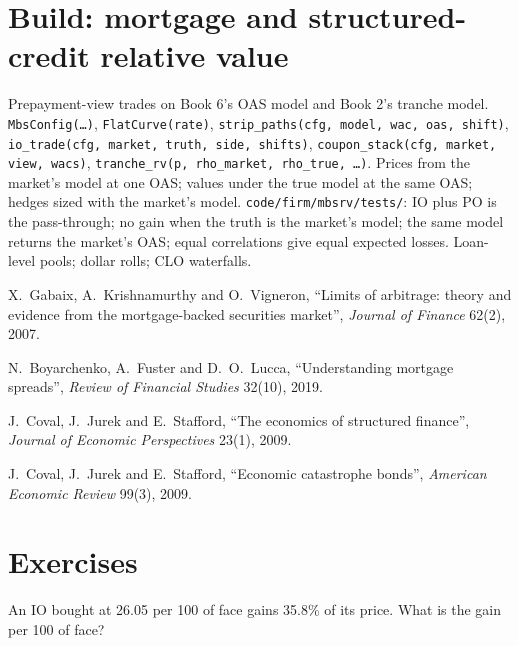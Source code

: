 \section{Build: mortgage and structured-credit relative value}\label{bld:s2:mortgage-and-structured-credit-strategies:mbsrv}

\begin{build}
 Prepayment-view trades on Book 6's OAS model and Book 2's tranche model.
 \texttt{MbsConfig(\dots)}, \texttt{FlatCurve(rate)}, \texttt{strip\_paths(cfg, model, wac, oas, shift)},
\texttt{io\_trade(cfg, market, truth, side, shifts)}, \texttt{coupon\_stack(cfg, market, view, wacs)}, \texttt{tranche\_rv(p, rho\_market,
rho\_true, \dots)}.
 Prices from the market's model at one OAS; values under the true model at the same OAS; hedges sized with the market's model.
 \texttt{code/firm/mbsrv/tests/}: IO plus PO is the pass-through; no gain when the truth is the market's model; the same
model returns the market's OAS; equal correlations give equal expected losses.
 Loan-level pools; dollar rolls; CLO waterfalls.
\end{build}

\begin{omsources}
\item X.~Gabaix, A.~Krishnamurthy and O.~Vigneron, ``Limits of arbitrage: theory and evidence from the mortgage-backed securities market'',
\emph{Journal of Finance} 62(2), 2007.
\item N.~Boyarchenko, A.~Fuster and D.~O.~Lucca, ``Understanding mortgage spreads'', \emph{Review of Financial Studies} 32(10), 2019.
\item J.~Coval, J.~Jurek and E.~Stafford, ``The economics of structured finance'', \emph{Journal of Economic Perspectives} 23(1), 2009.
\item J.~Coval, J.~Jurek and E.~Stafford, ``Economic catastrophe bonds'', \emph{American Economic Review} 99(3), 2009.
\end{omsources}

\section{Exercises}

\begin{exercise}[$\star$]\label{exo:s2:mortgage-and-structured-credit-strategies:1}
An IO bought at 26.05 per 100 of face gains 35.8\% of its price. What is the gain per 100 of face?
\end{exercise}


